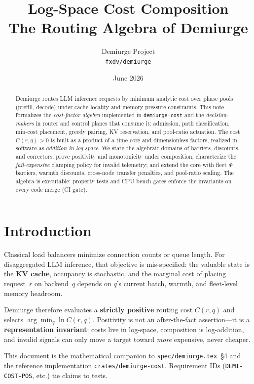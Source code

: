 \documentclass[11pt,a4paper]{article}
\title{%
  \textbf{Log-Space Cost Composition}\\
  \large The Routing Algebra of Demiurge
}
\author{Demiurge Project\\\small\texttt{fxdv/demiurge}}
\date{June 2026}
\begin{document}
\maketitle

\begin{abstract}
Demiurge routes LLM inference requests by minimum analytic cost over phase pools
(prefill, decode) under cache-locality and memory-pressure constraints.
This note formalizes the \emph{cost-factor algebra} implemented in
\texttt{demiurge-cost} and the \emph{decision-makers} in router and control
planes that consume it: admission, path classification, min-cost placement,
greedy pairing, KV reservation, and pool-ratio actuation.
The cost $C(r,q) > 0$ is built as a product of a time core and dimensionless factors,
realized in software as \emph{addition in log-space}.
We state the algebraic domains of barriers, discounts, and correctors;
prove positivity and monotonicity under composition; characterize the
\emph{fail-expensive} clamping policy for invalid telemetry; and extend the
core with fleet $\Phi$ barriers, warmth discounts, cross-node transfer penalties,
and pool-ratio scaling.
The algebra is executable: property tests and CPU bench gates enforce the
invariants on every code merge (CI gate).
\end{abstract}

\section{Introduction}

Classical load balancers minimize connection counts or queue length.
For disaggregated LLM inference, that objective is mis-specified: the valuable
state is the \textbf{KV cache}, occupancy is stochastic, and the marginal cost
of placing request~$r$ on backend~$q$ depends on $q$'s current batch, warmth,
and fleet-level memory headroom.

Demiurge therefore evaluates a \textbf{strictly positive} routing cost
$C(r,q)$ and selects $\arg\min_q \ln C(r,q)$.
Positivity is not an after-the-fact assertion---it is a \textbf{representation
invariant}: costs live in log-space, composition is log-addition, and invalid
signals can only move a target toward \emph{more} expensive, never cheaper.

This document is the mathematical companion to
\texttt{spec/demiurge.tex}~\S4 and the reference implementation
\texttt{crates/demiurge-cost}.
Requirement IDs (\texttt{DEMI-COST-POS}, etc.) tie claims to tests.
\end{document}
